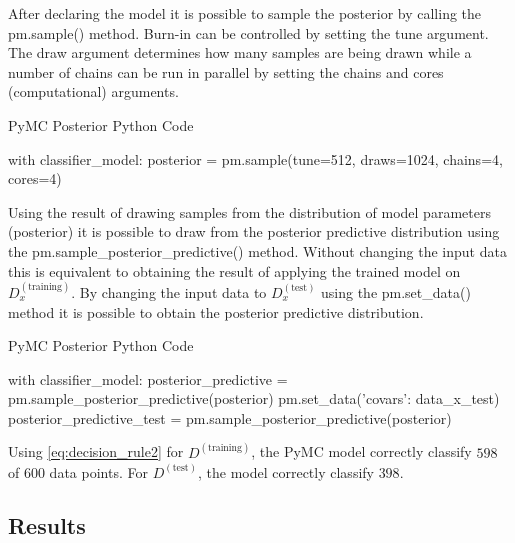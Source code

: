 \begin{example}
	
	After declaring the model it is possible to sample the posterior by calling the pm.sample() method. Burn-in can be controlled by setting the tune argument. The draw argument determines how many samples are being drawn while a number of chains can be run in parallel by setting the chains and cores (computational) arguments. 	
	\begin{algorithm}[H]
		\label{algo:posteriro}
		\caption{PyMC Posterior Python Code}
		\begin{python}
			with classifier_model:
			posterior = pm.sample(tune=512, draws=1024, chains=4, cores=4)
		\end{python}  
	\end{algorithm}
	
	Using the result of drawing samples from the distribution of model parameters (posterior) it is possible to draw from the posterior predictive distribution using the pm.sample\_posterior\_predictive() method. Without changing the input data this is equivalent to obtaining the result of applying the trained model on $D_x^{(\text{training})}$. By changing the input data to $D_x^{(\text{test})}$ using the pm.set\_data() method it is possible to obtain the posterior predictive distribution.
	
	\begin{algorithm}[H]
		\label{algo:posteriro_predictive}
		\caption{PyMC Posterior Python Code}
		\begin{python}
			with classifier_model:
			posterior_predictive = pm.sample_posterior_predictive(posterior)
			pm.set_data({'covars': data_x_test})
			posterior_predictive_test = pm.sample_posterior_predictive(posterior)
		\end{python}
	\end{algorithm}
	
	Using \ref{eq:decision_rule2} for $D^{(\text{training})}$, the PyMC model correctly classify $598$ of $600$ data points. For $D^{(\text{test})}$, the model correctly classify $398$.
	
	\subsection{Results}

\end{example}
